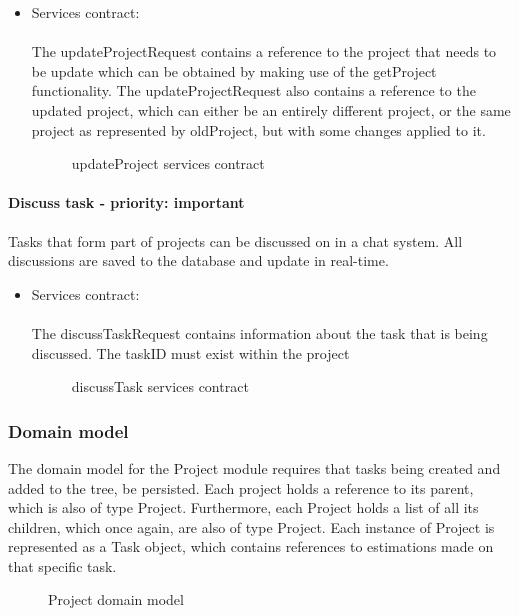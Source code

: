 \begin{itemize}
	\item Services contract:\\ \\
	The updateProjectRequest contains a reference to the project that needs to be update which can be obtained by making use of the getProject functionality. The updateProjectRequest also contains a reference to the updated project, which can either be an entirely different project, or the same project as represented by oldProject, but with some changes applied to it.
	\begin{figure}[H]
    	\centering
    	\caption{updateProject services contract}
    	\label{fig:updateProject_services_contract}
   	\end{figure}
\end{itemize}

\paragraph{Discuss task - priority: important}
Tasks that form part of projects can be discussed on in a chat system. All discussions are saved to the database and update in real-time.

\begin{itemize}
	\item Services contract:\\ \\
	The discussTaskRequest contains information about the task that is being discussed. The taskID must exist within the project
	\begin{figure}[H]
    	\centering
    	\caption{discussTask services contract}
    	\label{fig:discussTask_services_contract}
   	\end{figure}
\end{itemize}

\subsubsection{Domain model}
The domain model for the Project module requires that tasks being created and added to the tree, be persisted. Each project holds a reference to its parent, which is also of type Project. Furthermore, each Project holds a list of all its children, which once again, are also of type Project. Each instance of Project is represented as a Task object, which contains references to estimations made on that specific task.
\begin{figure}[H]
	\centering
	\caption{Project domain model}
	\label{fig:Project_domain_model}
\end{figure}

